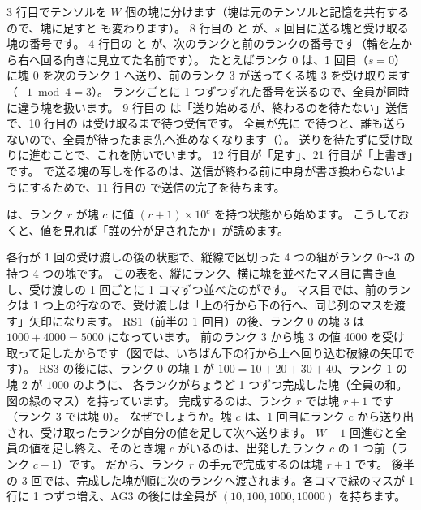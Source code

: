 3 行目でテンソルを $W$ 個の塊に分けます（塊は元のテンソルと記憶を共有するので、塊に足すと  も変わります）。
8 行目の  と  が、$s$ 回目に送る塊と受け取る塊の番号です。
4 行目の  と  が、次のランクと前のランクの番号です（輪を左から右へ回る向きに見立てた名前です）。
たとえばランク 0 は、1 回目（$s=0$）に塊 0 を次のランク 1 へ送り、前のランク 3 が送ってくる塊 3 を受け取ります（$-1 \bmod 4=3$）。
ランクごとに 1 つずつずれた番号を送るので、全員が同時に違う塊を扱います。
9 行目の  は「送り始めるが、終わるのを待たない」送信で、10 行目の  は受け取るまで待つ受信です。
全員が先に  で待つと、誰も送らないので、全員が待ったまま先へ進めなくなります（）。
送りを待たずに受け取りに進むことで、これを防いでいます。
12 行目が「足す」、21 行目が「上書き」です。
 で送る塊の写しを作るのは、送信が終わる前に中身が書き換わらないようにするためで、11 行目の  で送信の完了を待ちます。

 は、ランク $r$ が塊 $c$ に値 $(r+1)\times 10^{c}$ を持つ状態から始めます。
こうしておくと、値を見れば「誰の分が足されたか」が読めます。


各行が 1 回の受け渡しの後の状態で、縦線で区切った 4 つの組がランク 0〜3 の持つ 4 つの塊です。
この表を、縦にランク、横に塊を並べたマス目に書き直し、受け渡しの 1 回ごとに 1 コマずつ並べたのがです。
マス目では、前のランクは 1 つ上の行なので、受け渡しは「上の行から下の行へ、同じ列のマスを渡す」矢印になります。
RS1（前半の 1 回目）の後、ランク 0 の塊 3 は $1000+4000=5000$ になっています。
前のランク 3 から塊 3 の値 4000 を受け取って足したからです（図では、いちばん下の行から上へ回り込む破線の矢印です）。
RS3 の後には、ランク 0 の塊 1 が $100=10+20+30+40$、ランク 1 の塊 2 が $1000$ のように、
各ランクがちょうど 1 つずつ完成した塊（全員の和。図の緑のマス）を持っています。
完成するのは、ランク $r$ では塊 $r+1$ です（ランク 3 では塊 0）。
なぜでしょうか。塊 $c$ は、1 回目にランク $c$ から送り出され、受け取ったランクが自分の値を足して次へ送ります。
$W-1$ 回進むと全員の値を足し終え、そのとき塊 $c$ がいるのは、出発したランク $c$ の 1 つ前（ランク $c-1$）です。
だから、ランク $r$ の手元で完成するのは塊 $r+1$ です。
後半の 3 回では、完成した塊が順に次のランクへ渡されます。各コマで緑のマスが 1 行に 1 つずつ増え、AG3 の後には全員が $(10,100,1000,10000)$ を持ちます。

